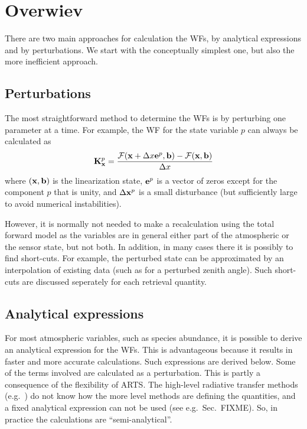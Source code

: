 \section{Overwiev}
\label{sec:wfuns:overw}
%
There are two main approaches for calculation the WFs, by analytical
expressions and by perturbations. We start with the conceptually simplest one,
but also the more inefficient approach.



\subsection{Perturbations}
\label{sec:wfuns:pert}
%
The most straightforward method to determine the WFs is by perturbing
one parameter at a time. For example, the WF for the state variable
$p$ can always be calculated as 
\begin{equation}
  \mathbf{K}_{\mathbf{x}}^p = \frac{\mathcal{F}(\mathbf{x}+\Delta x\mathbf{e}^p,\mathbf{b})-
                              \mathcal{F}(\mathbf{x},\mathbf{b})}{\Delta x}
 \label{eq:wfuns:perturb}
\end{equation}
where $(\mathbf{x},\mathbf{b})$ is the linearization state, $\mathbf{e}^p$ is a
vector of zeros except for the component $p$ that is unity, and
$\Delta\mathbf{x}^p$ is a small disturbance (but sufficiently large to avoid
numerical instabilities).

However, it is normally not needed to make a recalculation using the total
forward model as the variables are in general either part of the atmospheric or
the sensor state, but not both. In addition, in many cases there it is possibly
to find short-cuts. For example, the perturbed state can be approximated by an
interpolation of existing data (such as for a perturbed zenith angle). Such
short-cuts are discussed seperately for each retrieval quantity.


\subsection{Analytical expressions}
\label{sec:wfuns:anal}
%
For most atmospheric variables, such as species abundance, it is possible to
derive an analytical expression for the WFs. This is advantageous because it
results in faster and more accurate calculations. Such expressions are derived
below. Some of the terms involved are calculated as a perturbation. This is
partly a consequence of the flexibility of ARTS. The high-level radiative
transfer methods (e.g.\ ) do not know
how the more level methods are defining the quantities, and a fixed analytical
expression can not be used (see e.g.\ Sec.~FIXME). So, in practice the
calculations are ``semi-analytical''.

